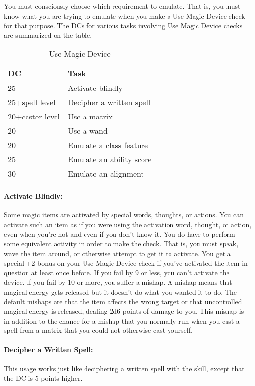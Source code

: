 You must consciously choose which requirement to emulate. That is, you must know what you are trying to emulate when you make a Use Magic Device check for that purpose. The DCs for various tasks involving Use Magic Device checks are summarized on the  table.
\begin{table*}
\centering
\caption{Use Magic Device}
\small
\label{tab:UseMagicDevice}
\begin{tabular}{|l|l|}
\hline
\textbf{DC}&\textbf{Task}\\
\hline
25&Activate blindly\\
25+spell level&Decipher a written spell\\
20+caster level&Use a matrix\\
20&Use a wand\\
20&Emulate a class feature\\
25&Emulate an ability score\\
30&Emulate an alignment\\
\hline
\end{tabular}
\normalsize
\end{table*}
\paragraph{Activate Blindly:}
Some magic items are activated by special words, thoughts, or actions. 
You can activate such an item as if you were using the activation word, thought, or action, even when you're not and even if you don't know it.
You do have to perform some equivalent activity in order to make the check. 
That is, you must speak, wave the item around, or otherwise attempt to get it to activate. 
You get a special +2 bonus on your Use Magic Device check if you've activated the item in question at least once before. 
If you fail by 9 or less, you can't activate the device. If you fail by 10 or more, you suffer a mishap. 
A mishap means that magical energy gets released but it doesn't do what you wanted it to do. 
The default mishaps are that the item affects the wrong target or that uncontrolled magical energy is released, dealing 2d6 points of damage to you. 
This mishap is in addition to the chance for a mishap that you normally run when you cast a spell from a matrix that you could not otherwise cast yourself.

\paragraph{Decipher a Written Spell:}
This usage works just like deciphering a written spell with the  skill, except that the DC is 5 points higher. 


